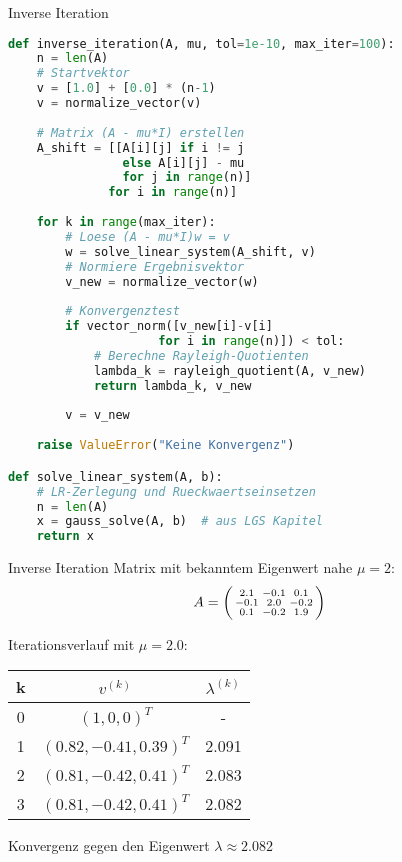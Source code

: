 \begin{examplecode}{Inverse Iteration}
\begin{lstlisting}[language=Python, style=basesmol]
def inverse_iteration(A, mu, tol=1e-10, max_iter=100):
    n = len(A)
    # Startvektor
    v = [1.0] + [0.0] * (n-1)
    v = normalize_vector(v)
    
    # Matrix (A - mu*I) erstellen
    A_shift = [[A[i][j] if i != j 
                else A[i][j] - mu 
                for j in range(n)] 
              for i in range(n)]
    
    for k in range(max_iter):
        # Loese (A - mu*I)w = v
        w = solve_linear_system(A_shift, v)
        # Normiere Ergebnisvektor
        v_new = normalize_vector(w)
        
        # Konvergenztest
        if vector_norm([v_new[i]-v[i] 
                     for i in range(n)]) < tol:
            # Berechne Rayleigh-Quotienten
            lambda_k = rayleigh_quotient(A, v_new)
            return lambda_k, v_new
            
        v = v_new
    
    raise ValueError("Keine Konvergenz")

def solve_linear_system(A, b):
    # LR-Zerlegung und Rueckwaertseinsetzen
    n = len(A)
    x = gauss_solve(A, b)  # aus LGS Kapitel
    return x
\end{lstlisting}
\end{examplecode}

\begin{example2}{Inverse Iteration}
Matrix mit bekanntem Eigenwert nahe $\mu = 2$:
$$A = \begin{psmallmatrix}
2.1 & -0.1 & 0.1\\
-0.1 & 2.0 & -0.2\\
0.1 & -0.2 & 1.9
\end{psmallmatrix}$$

Iterationsverlauf mit $\mu = 2.0$:
\begin{center}
\begin{tabular}{c|c|c}
k & $v^{(k)}$ & $\lambda^{(k)}$ \\\hline
0 & $(1, 0, 0)^T$ & -\\
1 & $(0.82, -0.41, 0.39)^T$ & 2.091\\
2 & $(0.81, -0.42, 0.41)^T$ & 2.083\\
3 & $(0.81, -0.42, 0.41)^T$ & 2.082
\end{tabular}
\end{center}

Konvergenz gegen den Eigenwert $\lambda \approx 2.082$
\end{example2}

